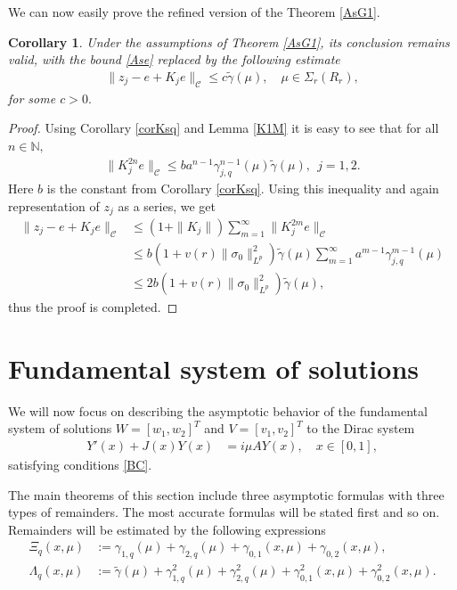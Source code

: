 \documentclass[11pt]{amsart}
\theoremstyle{plain}
\newtheorem{cor}[thm]{Corollary}
\theoremstyle{definition}
\theoremstyle{remark}
\numberwithin{equation}{section}
\begin{document}
We can now easily prove the refined version of the Theorem \ref{AsG1}.
\begin{cor}\label{AsGC}
Under the assumptions of Theorem \ref{AsG1}, its conclusion remains valid, with the bound \eqref{Ase} replaced by
the following estimate
\begin{align*}
\|z_j-e+K_je\|_{\mathcal C}
\le  c \widetilde{\gamma}(\mu), \quad \mu \in \Sigma_r(R_r),
\end{align*}
for some $c>0.$
\end{cor}
\begin{proof}

Using Corollary \ref{corKsq} and Lemma \ref{K1M} it is
easy to see that for all $n \in \mathbb N,$
\begin{align}\label{K1200}
\|K_j^{2n}e\|_{\mathcal C}\le  b a^{n-1}\gamma_{j,q}^{n-1}(\mu) \widetilde{\gamma}(\mu), \ \ j=1,2.
\end{align}
Here $b$ is the constant from Corollary \ref{corKsq}.
Using this inequality and again representation of $z_j$ as a series, we get
\begin{align*}
\|z_j-e+K_je\|_{\mathcal C}
&\le
(1+\|K_j\|)\sum_{m=1}^\infty  \|K_j^{2m}e\|_{\mathcal C}
\\
& \leq b(1+v(r)\|\sigma_0\|^2_{L^p}) \widetilde{\gamma}(\mu)
\sum_{m=1}^\infty  a^{m-1} \gamma_{j,q}^{m-1}(\mu)\\
& \leq 2 b(1+v(r)\|\sigma_0\|^2_{L^p}) \widetilde{\gamma}(\mu),
\end{align*}
thus the proof is completed.
\end{proof}


\section{Fundamental system of solutions}

We will now focus on describing the asymptotic behavior of the fundamental system
of solutions $W=[w_1, w_2]^T$ and $V=[v_1,v_2]^T$ to
the Dirac system
\begin{align}\label{DI}
Y'(x)+J(x) Y(x)&=i\mu AY(x),\quad
 x\in [0,1],
\end{align}
satisfying conditions \eqref{BC}.

The main theorems of this section include three asymptotic formulas with three types of remainders.
The most accurate formulas will be stated first and so on.
Remainders will be estimated by the following expressions
\begin{align}\label{la}
\Xi_q(x,\mu) & :=\gamma_{1,q}(\mu)+\gamma_{2,q}(\mu)+
  \gamma_{0,1}(x,\mu)+\gamma_{0,2}(x,\mu),\\
  \Lambda_q(x,\mu) & :=\widetilde{\gamma}(\mu)+\gamma^2_{1,q}(\mu)+\gamma^2_{2,q}(\mu)+
  \gamma^2_{0,1}(x,\mu)+\gamma^2_{0,2}(x,\mu).
\end{align}
\end{document}
